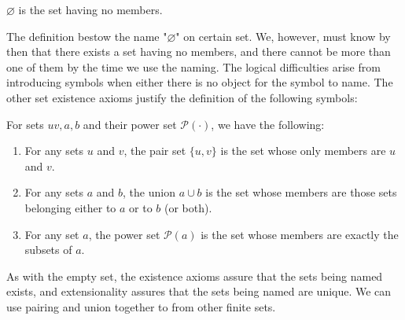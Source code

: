 \begin{definition}
    $\varnothing$ is the set having no members.
\end{definition}
The definition bestow the name "$\varnothing$" on certain set. We, however, must know by then that there exists a set having no members, and there cannot be more than one of them by the time we use the naming. The logical difficulties arise from introducing symbols when either there is no object for the symbol to name. The other set existence axioms justify the definition of the following symbols: 
\begin{definition}
    For sets $uv,a,b$ and their power set $\mathcal{P}(\cdot)$, we have the following: 
    \begin{enumerate}[label=\roman*.,noitemsep,topsep=0pt]
        \item For any sets $u$ and $v$, the pair set $\{u,v\}$ is the set whose only members are $u$ and $v$. 
        \item For any sets $a$ and $b$, the union $a\cup b$ is the set whose members are those sets belonging either to $a$ or to $b$ (or both).
        \item For any set $a$, the power set $\mathcal{P}(a)$ is the set whose members are exactly the subsets of $a$.
    \end{enumerate}
\end{definition}

As with the empty set, the existence axioms assure that the sets being named exists, and extensionality assures that the sets being named are unique. We can use pairing and union together to from other finite sets. 


